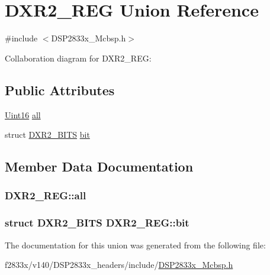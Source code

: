 \hypertarget{union_d_x_r2___r_e_g}{}\section{D\+X\+R2\+\_\+\+R\+E\+G Union Reference}
\label{union_d_x_r2___r_e_g}


{\ttfamily \#include $<$D\+S\+P2833x\+\_\+\+Mcbsp.\+h$>$}



Collaboration diagram for D\+X\+R2\+\_\+\+R\+E\+G\+:
\subsection*{Public Attributes}
\begin{DoxyCompactItemize}
\item 
\hyperlink{_d_s_p2833x___device_8h_a59a9f6be4562c327cbfb4f7e8e18f08b}{Uint16} \hyperlink{union_d_x_r2___r_e_g_a55b8a9180141a56fdd5c5d02edbeb756}{all}
\item 
struct \hyperlink{struct_d_x_r2___b_i_t_s}{D\+X\+R2\+\_\+\+B\+I\+T\+S} \hyperlink{union_d_x_r2___r_e_g_a10a5a863ba7beff7fde5d9aab6cb8055}{bit}
\end{DoxyCompactItemize}


\subsection{Member Data Documentation}
\hypertarget{union_d_x_r2___r_e_g_a55b8a9180141a56fdd5c5d02edbeb756}{}
\subsubsection[{all}]{ D\+X\+R2\+\_\+\+R\+E\+G\+::all}\label{union_d_x_r2___r_e_g_a55b8a9180141a56fdd5c5d02edbeb756}
\hypertarget{union_d_x_r2___r_e_g_a10a5a863ba7beff7fde5d9aab6cb8055}{}
\subsubsection[{bit}]{\setlength{\rightskip}{0pt plus 5cm}struct {\bf D\+X\+R2\+\_\+\+B\+I\+T\+S} D\+X\+R2\+\_\+\+R\+E\+G\+::bit}\label{union_d_x_r2___r_e_g_a10a5a863ba7beff7fde5d9aab6cb8055}


The documentation for this union was generated from the following file\+:\begin{DoxyCompactItemize}
\item 
f2833x/v140/\+D\+S\+P2833x\+\_\+headers/include/\hyperlink{_d_s_p2833x___mcbsp_8h}{D\+S\+P2833x\+\_\+\+Mcbsp.\+h}\end{DoxyCompactItemize}
